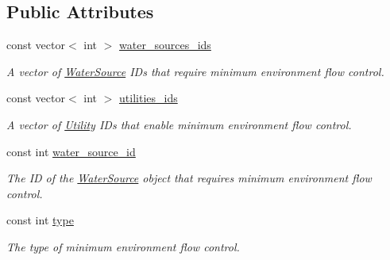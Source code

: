 \subsection*{Public Attributes}
\begin{DoxyCompactItemize}
\item 
const vector$<$ int $>$ \mbox{\hyperlink{classMinEnvironFlowControl_a1544571a77557853d0cc8189bd29f4b3}{water\+\_\+sources\+\_\+ids}}
\begin{DoxyCompactList}\small\item\em A vector of \mbox{\hyperlink{classWaterSource}{Water\+Source}} I\+Ds that require minimum environment flow control. \end{DoxyCompactList}\item 
const vector$<$ int $>$ \mbox{\hyperlink{classMinEnvironFlowControl_ae5acc488f8a0b8aaf7a85cfc8a25bbf9}{utilities\+\_\+ids}}
\begin{DoxyCompactList}\small\item\em A vector of \mbox{\hyperlink{classUtility}{Utility}} I\+Ds that enable minimum environment flow control. \end{DoxyCompactList}\item 
const int \mbox{\hyperlink{classMinEnvironFlowControl_a571d4d56086eb752aebb20b2d85fa8e7}{water\+\_\+source\+\_\+id}}
\begin{DoxyCompactList}\small\item\em The ID of the \mbox{\hyperlink{classWaterSource}{Water\+Source}} object that requires minimum environment flow control. \end{DoxyCompactList}\item 
const int \mbox{\hyperlink{classMinEnvironFlowControl_a1a10a6b5720c934eef698cd72c9d883c}{type}}
\begin{DoxyCompactList}\small\item\em The type of minimum environment flow control. \end{DoxyCompactList}\end{DoxyCompactItemize}
